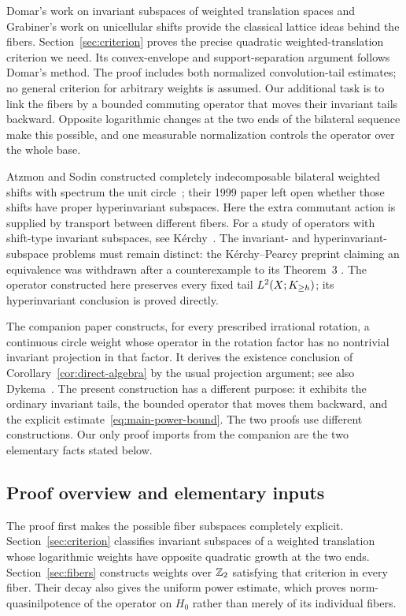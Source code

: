 Domar's work on invariant subspaces of weighted translation spaces
\cite{Domar1981} and Grabiner's work on unicellular shifts
\cite{Grabiner1982} provide the classical lattice ideas behind the
fibers. Section~\ref{sec:criterion} proves the precise quadratic
weighted-translation criterion we need. Its convex-envelope and
support-separation argument follows Domar's method. The proof includes
both normalized convolution-tail estimates; no general criterion for
arbitrary weights is assumed. Our additional task is to link the fibers
by a bounded commuting operator that moves their invariant tails
backward. Opposite logarithmic changes at the two ends of the bilateral
sequence make this possible, and one measurable normalization controls
the operator over the whole base.

Atzmon and Sodin constructed completely indecomposable bilateral
weighted shifts with spectrum the unit circle~\cite{AtzmonSodin1999};
their 1999 paper left open whether those shifts have proper hyperinvariant
subspaces. Here the extra commutant action is supplied by transport
between different fibers. For a study of operators with shift-type invariant subspaces,
see K\'erchy~\cite{Kerchy2026}.
The invariant- and hyperinvariant-subspace problems must remain
distinct: the K\'erchy--Pearcy preprint claiming an equivalence was
withdrawn after a counterexample to its Theorem~3
\cite{KerchyPearcy2025Withdrawn}. The operator constructed here preserves
every fixed tail $L^2(X;K_{\ge h})$; its hyperinvariant conclusion is
proved directly.

The companion paper \cite{CircleCompanion} constructs, for every
prescribed irrational rotation, a continuous circle weight whose
operator in the rotation factor has no nontrivial invariant projection
in that factor. It derives the existence conclusion of
Corollary~\ref{cor:direct-algebra} by the usual projection argument;
see also Dykema~\cite[Proposition~2.1]{Dykema2005}.
The present construction has a different purpose: it exhibits the
ordinary invariant tails, the bounded operator that moves them backward,
and the explicit estimate~\eqref{eq:main-power-bound}. The two proofs
use different constructions. Our only proof imports from the companion
are the two elementary facts stated below.

\subsection{Proof overview and elementary inputs}
The proof first makes the possible fiber subspaces completely explicit.
Section~\ref{sec:criterion} classifies invariant subspaces of a weighted
translation whose logarithmic weights have opposite quadratic growth
at the two ends. Section~\ref{sec:fibers} constructs weights over
$\mathbb Z_2$ satisfying that criterion in every fiber. Their decay also gives
the uniform power estimate, which proves norm-quasinilpotence of the
operator on $H_0$ rather than merely of its individual fibers.

